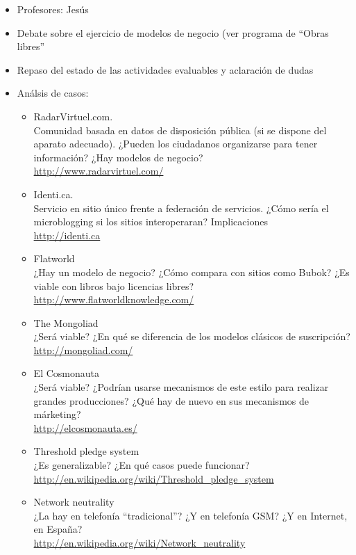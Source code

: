 \documentclass[a4paper,12pt]{article}
\begin{document}
\begin{itemize}
\item Profesores: Jesús
\item Debate sobre el ejercicio de modelos de negocio (ver programa de ``Obras libres''
\item Repaso del estado de las actividades evaluables y aclaración de dudas
\item Análsis de casos:
  \begin{itemize}
  \item RadarVirtuel.com. \\
    Comunidad basada en datos de disposición pública (si se dispone del aparato adecuado). ¿Pueden los ciudadanos organizarse para tener información? ¿Hay modelos de negocio? \\
    \url{http://www.radarvirtuel.com/}
  \item Identi.ca. \\
    Servicio en sitio único frente a federación de servicios. ¿Cómo sería el microblogging si los sitios interoperaran? Implicaciones \\
    \url{http://identi.ca}
  \item Flatworld \\
    ¿Hay un modelo de negocio? ¿Cómo compara con sitios como Bubok? ¿Es viable con libros bajo licencias libres?\\
    \url{http://www.flatworldknowledge.com/}
  \item The Mongoliad \\
    ¿Será viable? ¿En qué se diferencia de los modelos clásicos de suscripción? \\
    \url{http://mongoliad.com/}
  \item El Cosmonauta \\
    ¿Será viable? ¿Podrían usarse mecanismos de este estilo para realizar grandes producciones? ¿Qué hay de nuevo en sus mecanismos de márketing?\\
    \url{http://elcosmonauta.es/}
  \item Threshold pledge system \\
    ¿Es generalizable? ¿En qué casos puede funcionar? \\
    \url{http://en.wikipedia.org/wiki/Threshold_pledge_system}
  \item Network neutrality \\
    ¿La hay en telefonía ``tradicional''? ¿Y en telefonía GSM? ¿Y en Internet, en España? \\
    \url{http://en.wikipedia.org/wiki/Network_neutrality}

\end{itemize}
\end{itemize}
\end{document}
